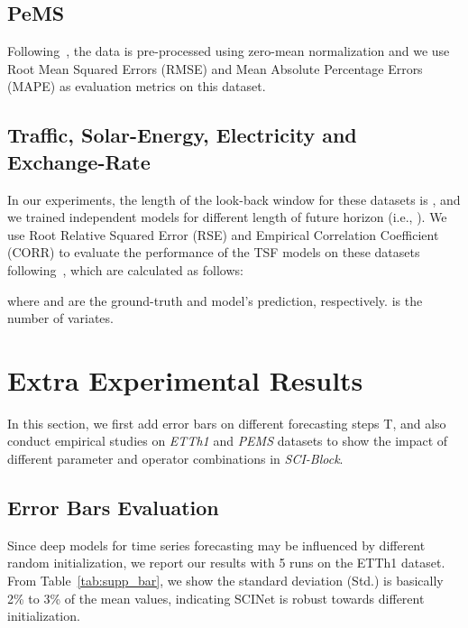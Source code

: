 \documentclass{article}
\begin{document}
\subsection{PeMS}



Following~\citep{Hyndman2006AnotherLA}, the data is pre-processed using zero-mean normalization and we use Root Mean Squared Errors (RMSE) and Mean Absolute Percentage Errors (MAPE) as evaluation metrics on this dataset. 















\subsection{Traffic, Solar-Energy, Electricity and Exchange-Rate}


In our experiments, the length of the look-back window  for these datasets is , and we trained independent models for different length of future horizon (i.e., ).
We use Root Relative Squared Error (RSE) and Empirical Correlation Coefficient (CORR) to evaluate the performance of the TSF models on these datasets following~\citep{Lai2018ModelingLA}, which are calculated as follows:


where  and  are the ground-truth and model's prediction, respectively.  is the number of variates. 






\section{Extra Experimental Results}
\label{sec:extra_results}
In this section, we first add error bars on different forecasting steps T, and also conduct  empirical studies on \emph{ETTh1} and \emph{PEMS} datasets to show the impact of different parameter and operator combinations in \emph{SCI-Block}.



\subsection{Error Bars Evaluation}
Since deep models for time series forecasting may be influenced by different random initialization, we report our results with 5 runs on the ETTh1 dataset. From Table~\ref{tab:supp_bar}, we show the standard deviation (Std.) is basically 2\% to 3\% of the mean values, indicating SCINet is robust towards different initialization.
\end{document}
